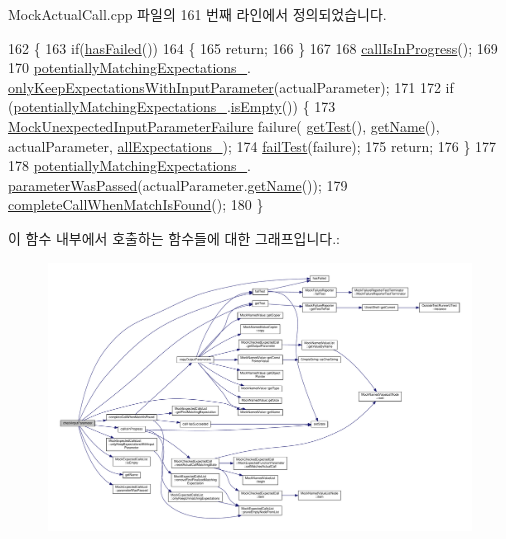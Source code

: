 Mock\+Actual\+Call.\+cpp 파일의 161 번째 라인에서 정의되었습니다.


\begin{DoxyCode}
162 \{
163     \textcolor{keywordflow}{if}(\hyperlink{class_mock_checked_actual_call_ae4deec08ed507f9a2f1cced854fc5a16}{hasFailed}())
164     \{
165         \textcolor{keywordflow}{return};
166     \}
167 
168     \hyperlink{class_mock_checked_actual_call_a60fd1e06699e3f79444c4e7f8055ac4a}{callIsInProgress}();
169 
170     \hyperlink{class_mock_checked_actual_call_a4fc6bec7509ed6eb28096956758c030a}{potentiallyMatchingExpectations\_}.
      \hyperlink{class_mock_expected_calls_list_a22b3e41fc543763ee323cf2fb84f7820}{onlyKeepExpectationsWithInputParameter}(actualParameter);
171 
172     \textcolor{keywordflow}{if} (\hyperlink{class_mock_checked_actual_call_a4fc6bec7509ed6eb28096956758c030a}{potentiallyMatchingExpectations\_}.\hyperlink{class_mock_expected_calls_list_a479432127ee77145cc19d6a2d1590821}{isEmpty}()) \{
173         \hyperlink{class_mock_unexpected_input_parameter_failure}{MockUnexpectedInputParameterFailure} failure(
      \hyperlink{class_mock_checked_actual_call_aa10112b41f7ed20162b12633042bb775}{getTest}(), \hyperlink{class_mock_checked_actual_call_ab9fb89f09ab681191e4eaa9221b42491}{getName}(), actualParameter, \hyperlink{class_mock_checked_actual_call_aed217603c4a32c8f55a3087ac4a64a78}{allExpectations\_});
174         \hyperlink{class_mock_checked_actual_call_a275e824525aa26cb8874437442cdc186}{failTest}(failure);
175         \textcolor{keywordflow}{return};
176     \}
177 
178     \hyperlink{class_mock_checked_actual_call_a4fc6bec7509ed6eb28096956758c030a}{potentiallyMatchingExpectations\_}.
      \hyperlink{class_mock_expected_calls_list_a236efae763fa47a7df636a5e148b6c31}{parameterWasPassed}(actualParameter.\hyperlink{class_mock_named_value_ab9fb89f09ab681191e4eaa9221b42491}{getName}());
179     \hyperlink{class_mock_checked_actual_call_aae5ca9ab18e1a3a03ab292e825e2ece6}{completeCallWhenMatchIsFound}();
180 \}
\end{DoxyCode}


이 함수 내부에서 호출하는 함수들에 대한 그래프입니다.\+:
\nopagebreak
\begin{figure}[H]
\begin{center}
\leavevmode
\includegraphics[width=350pt]{class_mock_checked_actual_call_a43315549d2e79952b76f087c3b9722cf_cgraph}
\end{center}
\end{figure}




